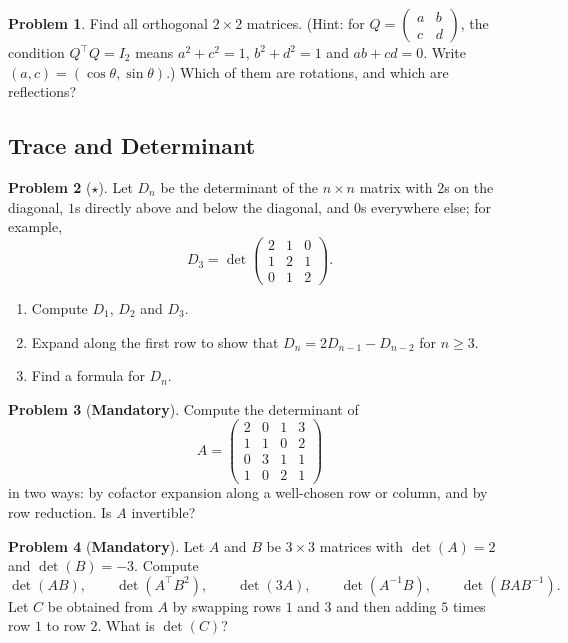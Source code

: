 \documentclass[11pt]{article}
\theoremstyle{definition}
\newtheorem{problem}{Problem}[section]
\newcommand{\mandatory}{\textcolor{red!70!black}{\textbf{Mandatory}}}
\begin{document}
\begin{problem}\label{pr:orthogonal2}
    Find all orthogonal $2 \times 2$ matrices. (Hint: for $Q = \begin{pmatrix} a & b \\ c & d \end{pmatrix}$, the condition $Q^\top Q = I_2$ means $a^2 + c^2 = 1$, $b^2 + d^2 = 1$ and $ab + cd = 0$. Write $(a, c) = (\cos\theta, \sin\theta)$.) Which of them are rotations, and which are reflections?
\end{problem}

\subsection{Trace and Determinant}

\begin{problem}[$\star$]\label{pr:tridiagonal}
    Let $D_n$ be the determinant of the $n \times n$ matrix with $2$s on the diagonal, $1$s directly above and below the diagonal, and $0$s everywhere else; for example,
    \[D_3 = \det \begin{pmatrix} 2 & 1 & 0 \\ 1 & 2 & 1 \\ 0 & 1 & 2 \end{pmatrix}.\]
    \begin{enumerate}[label=(\alph*)]
        \item Compute $D_1$, $D_2$ and $D_3$.
        \item Expand along the first row to show that $D_n = 2D_{n-1} - D_{n-2}$ for $n \geq 3$.
        \item Find a formula for $D_n$.
    \end{enumerate}
\end{problem}

\begin{problem}[\mandatory]\label{pr:det4}
    Compute the determinant of
    \[A = \begin{pmatrix} 2 & 0 & 1 & 3 \\ 1 & 1 & 0 & 2 \\ 0 & 3 & 1 & 1 \\ 1 & 0 & 2 & 1 \end{pmatrix}\]
    in two ways: by cofactor expansion along a well-chosen row or column, and by row reduction. Is $A$ invertible?
\end{problem}

\begin{problem}[\mandatory]\label{pr:det-rules}
    Let $A$ and $B$ be $3 \times 3$ matrices with $\det(A) = 2$ and $\det(B) = -3$. Compute
    \[\det(AB), \qquad \det(A^\top B^2), \qquad \det(3A), \qquad \det(A^{-1}B), \qquad \det(BAB^{-1}).\]
    Let $C$ be obtained from $A$ by swapping rows $1$ and $3$ and then adding $5$ times row $1$ to row $2$. What is $\det(C)$?
\end{problem}
\end{document}
